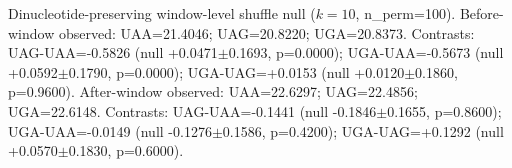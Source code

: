 Dinucleotide-preserving window-level shuffle null ($k=10$, n\_perm=100).
 Before-window observed: UAA=21.4046; UAG=20.8220; UGA=20.8373.
 Contrasts: UAG-UAA=-0.5826 (null +0.0471$\pm$0.1693, p=0.0000); UGA-UAA=-0.5673 (null +0.0592$\pm$0.1790, p=0.0000); UGA-UAG=+0.0153 (null +0.0120$\pm$0.1860, p=0.9600).
 After-window observed: UAA=22.6297; UAG=22.4856; UGA=22.6148.
 Contrasts: UAG-UAA=-0.1441 (null -0.1846$\pm$0.1655, p=0.8600); UGA-UAA=-0.0149 (null -0.1276$\pm$0.1586, p=0.4200); UGA-UAG=+0.1292 (null +0.0570$\pm$0.1830, p=0.6000).
